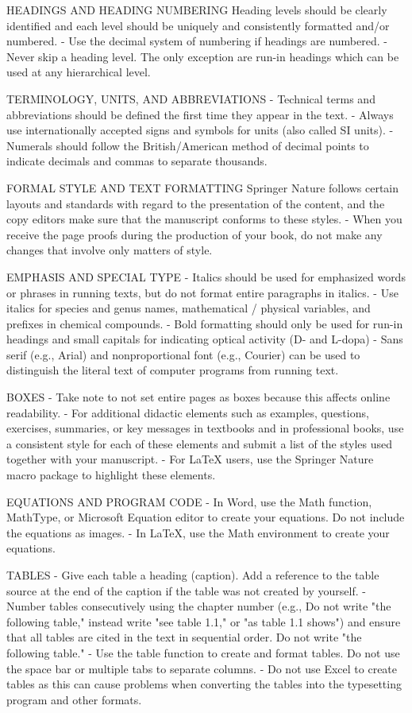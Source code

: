 HEADINGS AND HEADING NUMBERING
Heading levels should be clearly identified and each level should be uniquely and consistently formatted and/or numbered.
- Use the decimal system of numbering if headings are numbered.
- Never skip a heading level. The only exception are run-in headings which can be used at any hierarchical level.

TERMINOLOGY, UNITS, AND ABBREVIATIONS
- Technical terms and abbreviations should be defined the first time they appear in the text.
- Always use internationally accepted signs and symbols for units (also called SI units).
- Numerals should follow the British/American method of decimal points to indicate decimals and commas to separate thousands.

FORMAL STYLE AND TEXT FORMATTING
Springer Nature follows certain layouts and standards with regard to the presentation of the content, and the copy editors make sure that the manuscript conforms to these styles.
- When you receive the page proofs during the production of your book, do not make any changes that involve only matters of style.

EMPHASIS AND SPECIAL TYPE
- Italics should be used for emphasized words or phrases in running texts, but do not format entire paragraphs in italics.
- Use italics for species and genus names, mathematical / physical variables, and prefixes in chemical compounds.
- Bold formatting should only be used for run-in headings and small capitals for indicating optical activity (D- and L-dopa)
- Sans serif (e.g., Arial) and nonproportional font (e.g., Courier) can be used to distinguish the literal text of computer programs from running text.

BOXES
- Take note to not set entire pages as boxes because this affects online readability.
- For additional didactic elements such as examples, questions, exercises, summaries, or key messages in textbooks and in professional books, use a consistent style for each of these elements and submit a list of the styles used together with your manuscript.
- For LaTeX users, use the Springer Nature macro package to highlight these elements.

EQUATIONS AND PROGRAM CODE
- In Word, use the Math function, MathType, or Microsoft Equation editor to create your equations. Do not include the equations as images.
- In LaTeX, use the Math environment to create your equations.

TABLES
- Give each table a heading (caption). Add a reference to the table source at the end of the caption if the table was not created by yourself.
- Number tables consecutively using the chapter number (e.g., Do not write "the following table," instead write "see table 1.1," or "as table 1.1 shows") and ensure that all tables are cited in the text in sequential order. Do not write "the following table."
- Use the table function to create and format tables. Do not use the space bar or multiple tabs to separate columns.
- Do not use Excel to create tables as this can cause problems when converting the tables into the typesetting program and other formats.

